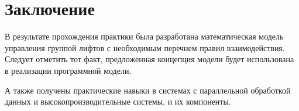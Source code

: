 \newpage
\section{Заключение}
	В результате прохождения практики была разработана математическая модель
		управления группой лифтов с необходимым перечнем правил взаимодействия.
		Следует отметить тот факт, предложенная концепция модели будет использована в реализации
		программной модели.

	А также получены практические навыки в системах с параллельной обработкой данных и высокопроизводительные системы, и их компоненты.
